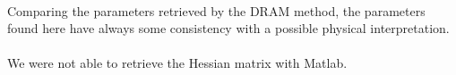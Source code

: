\documentclass[11pt, a4paper]{article}
\begin{document}
\paragraph{}
Comparing the parameters retrieved by the DRAM method, the parameters found here have always some consistency with a possible physical interpretation.

\paragraph{}
We were not able to retrieve the Hessian matrix with Matlab.




\end{document}
